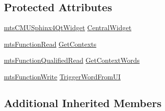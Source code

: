 \subsection*{Protected Attributes}
\begin{DoxyCompactItemize}
\item 
\hyperlink{classmts_c_m_u_sphinx4_qt_widget}{mts\-C\-M\-U\-Sphinx4\-Qt\-Widget} \hyperlink{classmts_c_m_u_sphinx4_qt_component_a4f68e26a921397008adf9df4cbff86b5}{Central\-Widget}
\item 
\hyperlink{classmts_function_read}{mts\-Function\-Read} \hyperlink{classmts_c_m_u_sphinx4_qt_component_a42002531b2d0e7e0d536350e51328693}{Get\-Contexts}
\item 
\hyperlink{classmts_function_qualified_read}{mts\-Function\-Qualified\-Read} \hyperlink{classmts_c_m_u_sphinx4_qt_component_adb8c49880a06b631f2a8f8a80c026dbb}{Get\-Context\-Words}
\item 
\hyperlink{classmts_function_write}{mts\-Function\-Write} \hyperlink{classmts_c_m_u_sphinx4_qt_component_a3d2e5606f0e3d92278f42b020bfec766}{Trigger\-Word\-From\-U\-I}
\end{DoxyCompactItemize}
\subsection*{Additional Inherited Members}


